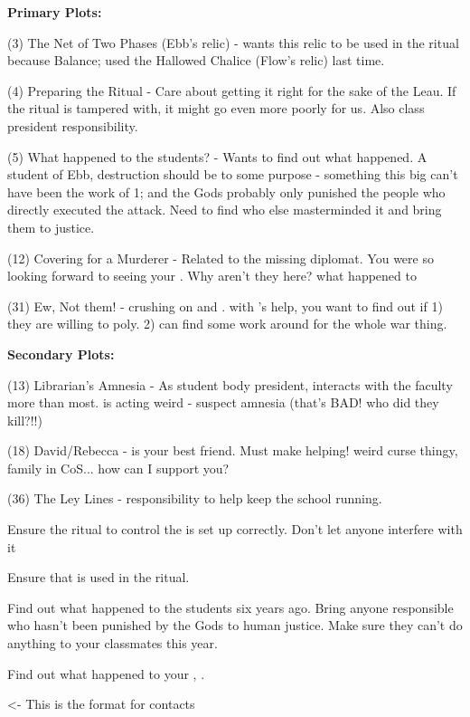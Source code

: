 \documentclass[char]{GL2020}
\begin{document}

\textbf{Primary Plots:}

(3) The Net of Two Phases (Ebb's relic)  - wants this relic to be used in the ritual because Balance; used the Hallowed Chalice (Flow's relic) last time.

(4) Preparing the Ritual - Care about getting it right for the sake of the Leau. If the ritual is tampered with, it might go even more poorly for us. Also class president responsibility.

(5) What happened to the students? - Wants to find out what happened. A student of Ebb, destruction should be to some purpose - something this big can’t have been the work of 1; and the Gods probably only punished the people who directly executed the attack. Need to find who else masterminded it and bring them to justice.

(12) Covering for a Murderer - Related to the missing diplomat. You were so looking forward to seeing your \cHeadDiplomat{\auncle}. Why aren't they here? what happened to \cHeadDiplomat{\them}

(31) Ew, Not them! - crushing on \cHeir{} and \cChupStudent{}. with \cInitiate{}'s help, you want to find out if 1) they are willing to poly. 2) can find some work around for the whole war thing.

\textbf{Secondary Plots:}

(13) Librarian’s Amnesia - As student body president, interacts with the faculty more than most. \cLibrarian{} is acting weird - suspect amnesia (that's BAD! who did they kill?!!)

(18) David/Rebecca - \cIntiate{} is your best friend. Must make helping! weird curse thingy, family in CoS... how can I support you?

(36) The Ley Lines - responsibility to help keep the school running.


\begin{itemz}[Goals]
	\item  Ensure the ritual to control the is set up correctly. Don't let anyone interfere with it
	\item Ensure that \iNet{} is used in the ritual.
	\item Find out what happened to the students six years ago. Bring anyone responsible who hasn't been punished  by the Gods to human justice. Make sure they can't do anything to your classmates this year.
	\item Find out what happened to your \cHeadDiplomat{\auncle}, \cHeadDiplomat{}.
\end{itemz}

\begin{itemz}[Notes]
	\item 
\end{itemz}

\begin{contacts}
	\contact{\cTest{}} <- This is the format for contacts
	
\end{contacts}
\end{document}
